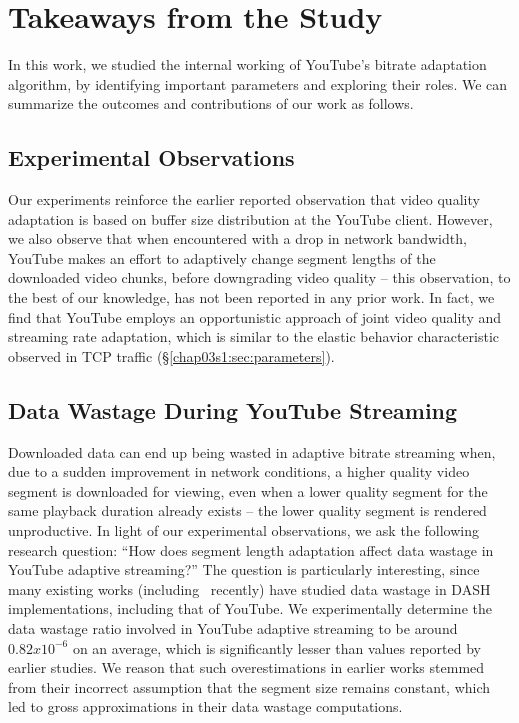 \section{Takeaways from the Study}
\label{chap03s1:sec:conclusion}

In this work, we studied the internal working of YouTube's bitrate adaptation algorithm, by identifying important parameters and exploring their roles.
We can summarize the outcomes and contributions of our work as follows.

\subsection{Experimental Observations} Our experiments reinforce the earlier reported observation that video quality adaptation is based on buffer size distribution at the YouTube client.
However, we also observe that when encountered with a drop in network bandwidth, YouTube makes an effort to adaptively change segment lengths of the downloaded video chunks, before downgrading video quality -- this observation, to the best of our knowledge, has not been reported in any prior work.
In fact, we find that YouTube employs an opportunistic approach of joint video quality and streaming rate adaptation, which is similar to the elastic behavior characteristic  observed in TCP traffic (\S\ref{chap03s1:sec:parameters}).

\subsection{Data Wastage During YouTube Streaming} Downloaded data can end up being wasted in adaptive bitrate streaming when, due to a sudden improvement in network conditions, a higher quality video segment is downloaded for viewing, even when a lower quality segment for the same playback duration already exists -- the lower quality segment is rendered unproductive.
In light of our experimental observations, we ask the following research question: ``How does segment length adaptation affect data wastage in YouTube adaptive streaming?''
The question is particularly interesting, since many existing works (including~\cite{sieber2016sacrificing} recently) have studied data wastage in DASH implementations, including that of YouTube.
We experimentally determine the data wastage ratio involved in YouTube adaptive streaming to be around $0.82x10^{-6}$ on an average, which is significantly lesser than values reported by earlier studies.%
We reason that such overestimations in earlier works stemmed from their incorrect assumption that the segment size remains constant, which led to gross approximations in their data wastage computations.

